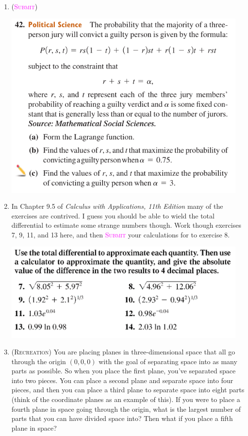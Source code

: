 \begin{enumerate}
    \item
        (\textsc{\textcolor{magenta}{Submit}})
        \begin{center}
            \includegraphics[width=0.96\textwidth]{screenshots/42.png}
        \end{center}

    \item %
        In Chapter 9.5 of \emph{Calculus with Applications, 11th Edition}
        many of the exercises are contrived. 
        I guess you should be able to wield the total differential 
        to estimate some strange numbers though.
        Work though exercises 7, 9, 11, and 13 here,
        and then \textsc{\textcolor{magenta}{Submit}} your 
        calculations for to exercise 8.
        \begin{center}
            \includegraphics[width=0.96\textwidth]{screenshots/7.png}
        \end{center}

    \item 
        (\textsc{Recreation})
You are placing planes in three-dimensional space that all go through the origin $(0,0,0)$
with the goal of separating space into as many parts as possible. So when you place the first plane,
you've separated space into two pieces. You can place a second plane and separate space into four pieces,
and then you can place a third plane to separate space into eight parts (think of the coordinate planes
as an example of this). If you were to place a fourth plane in space going through the origin, 
what is the largest number of parts that you can have divided space into?
Then what if you place a fifth plane in space?


\end{enumerate}
